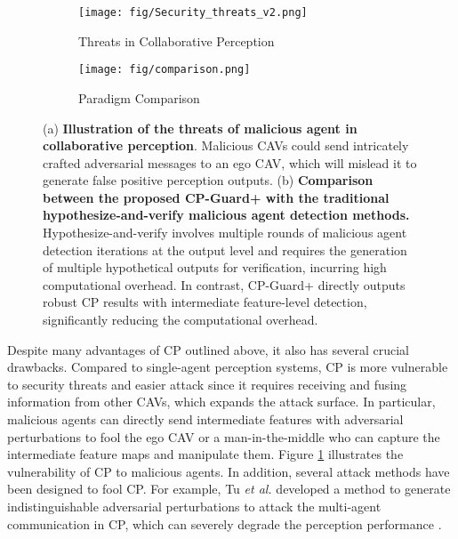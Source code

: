 \begin{figure*}[htbp]
    \centering
    
    \begin{subfigure}[b]{0.48\linewidth}
        \texttt{[image: fig/Security\_threats\_v2.png]}
        \caption{Threats in Collaborative Perception}
        \label{fig:security_threats}
    \end{subfigure}
    \hfill
    \begin{subfigure}[b]{0.48\linewidth}
        \texttt{[image: fig/comparison.png]}
        \caption{Paradigm Comparison}
        \label{fig:idea_comparison}
    \end{subfigure}
    \vspace{-3mm}
    \caption{(a) \textbf{Illustration of the threats of malicious agent in collaborative perception}. Malicious CAVs could send intricately crafted adversarial messages to an ego CAV, which will mislead it to generate false positive perception outputs. (b) \textbf{Comparison between the proposed CP-Guard+ with the traditional hypothesize-and-verify malicious agent detection methods.} 
    Hypothesize-and-verify involves multiple rounds of malicious agent detection iterations at the output level and requires the generation of multiple hypothetical outputs for verification, incurring high computational overhead. In contrast, CP-Guard+ directly outputs robust CP results with intermediate feature-level detection, significantly reducing the computational overhead.}
    \vspace{-5mm} 
\end{figure*}

Despite many advantages of CP outlined above, it also has several crucial drawbacks. Compared to single-agent perception systems, CP is more vulnerable to security threats and easier attack since it requires receiving and fusing information from other CAVs, which expands the attack surface. In particular, malicious agents can directly send intermediate features with adversarial perturbations to fool the ego CAV or a man-in-the-middle who can capture the intermediate feature maps and manipulate them. Figure \ref{fig:security_threats} illustrates the vulnerability of CP to malicious agents. In addition, several attack methods have been designed to fool CP. For example, Tu \textit{et al.} \citep{tuAdversarialAttacksMultiAgent2021} developed a method to generate indistinguishable adversarial perturbations to attack the multi-agent communication in CP, which can severely degrade the perception performance \cite{lin2024hierarchical,lin2025leo,lin2023pushing}. 


